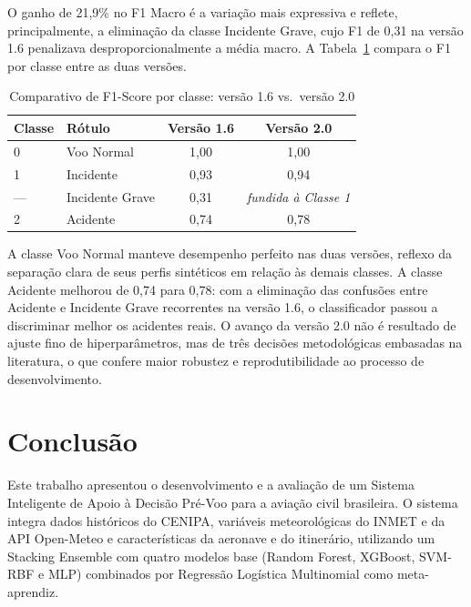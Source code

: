 \documentclass[english,brazilian]{UNISINOSartigo}
\begin{document}
O ganho de 21,9\% no F1 Macro é a variação mais expressiva e reflete,
principalmente, a eliminação da classe Incidente Grave, cujo F1 de 0,31
na versão 1.6 penalizava desproporcionalmente a média macro.
A Tabela~\ref{tab:comparativo_classes} compara o F1 por classe entre as duas versões.

\begin{table}[ht]
  \caption{Comparativo de F1-Score por classe: versão 1.6 vs.\ versão 2.0}
  \label{tab:comparativo_classes}
  \centering
  \begin{tabular}{llcc}
    \toprule
    \textbf{Classe} & \textbf{Rótulo} & \textbf{Versão 1.6} & \textbf{Versão 2.0} \\
    \midrule
    0   & Voo Normal      & 1,00 & 1,00 \\
    1   & Incidente       & 0,93 & 0,94 \\
    --- & Incidente Grave & 0,31 & \textit{fundida à Classe 1} \\
    2   & Acidente        & 0,74 & 0,78 \\
    \bottomrule
  \end{tabular}
\end{table}

A classe Voo Normal manteve desempenho perfeito nas duas versões, reflexo da
separação clara de seus perfis sintéticos em relação às demais classes.
A classe Acidente melhorou de 0,74 para 0,78: com a eliminação das confusões
entre Acidente e Incidente Grave recorrentes na versão 1.6, o classificador
passou a discriminar melhor os acidentes reais.
O avanço da versão 2.0 não é resultado de ajuste fino de hiperparâmetros,
mas de três decisões metodológicas embasadas na literatura, o que confere
maior robustez e reprodutibilidade ao processo de desenvolvimento.

\section{Conclusão}

Este trabalho apresentou o desenvolvimento e a avaliação de um Sistema
Inteligente de Apoio à Decisão Pré-Voo para a aviação civil brasileira. O sistema
integra dados históricos do CENIPA, variáveis meteorológicas do INMET e da API
Open-Meteo e características da aeronave e do itinerário, utilizando um Stacking
Ensemble com quatro modelos base (Random Forest, XGBoost, SVM-RBF e MLP)
combinados por Regressão Logística Multinomial como meta-aprendiz.
\end{document}
